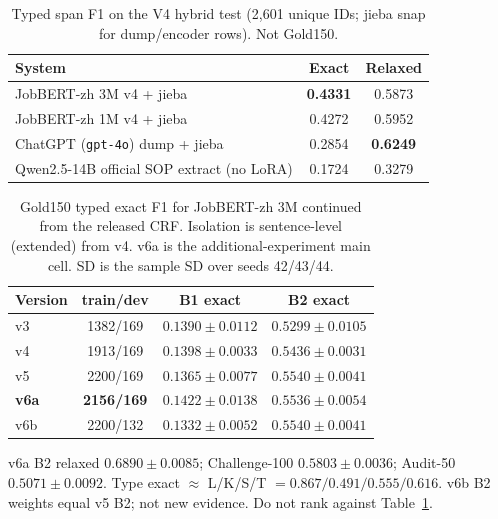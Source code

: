 
\begin{table}[t]
\caption{Typed span F1 on the V4 hybrid test (2,601 unique IDs; jieba snap for dump/encoder rows). Not Gold150.}
\label{tab:hybrid2601}
\centering
\begin{tabular}{lcc}
\hline
System & Exact & Relaxed \\
\hline
JobBERT-zh 3M v4 + jieba & \textbf{0.4331} & 0.5873 \\
JobBERT-zh 1M v4 + jieba & 0.4272 & 0.5952 \\
ChatGPT (\texttt{gpt-4o}) dump + jieba & 0.2854 & \textbf{0.6249} \\
Qwen2.5-14B official SOP extract (no LoRA) & 0.1724 & 0.3279 \\
\hline
\end{tabular}
\end{table}

\begin{table}[t]
\caption{Gold150 typed exact F1 for JobBERT-zh 3M continued from the released CRF. Isolation is sentence-level (extended) from v4. v6a is the additional-experiment main cell. SD is the sample SD over seeds 42/43/44.}
\label{tab:gold150-jobbert}
\centering
\begin{tabular}{lccc}
\hline
Version & train/dev & B1 exact & B2 exact \\
\hline
v3 & 1382/169 & $0.1390\pm0.0112$ & $0.5299\pm0.0105$ \\
v4 & 1913/169 & $0.1398\pm0.0033$ & $0.5436\pm0.0031$ \\
v5 & 2200/169 & $0.1365\pm0.0077$ & $0.5540\pm0.0041$ \\
\textbf{v6a} & \textbf{2156/169} & $0.1422\pm0.0138$ & $\mathbf{0.5536\pm0.0054}$ \\
v6b & 2200/132 & $0.1332\pm0.0052$ & $0.5540\pm0.0041$ \\
\hline
\end{tabular}

\vspace{0.4em}
{\small v6a B2 relaxed $0.6890\pm0.0085$; Challenge-100 $0.5803\pm0.0036$; Audit-50 $0.5071\pm0.0092$.
Type exact $\approx$ L/K/S/T $=0.867/0.491/0.555/0.616$.
v6b B2 weights equal v5 B2; not new evidence.
Do not rank against Table~\ref{tab:hybrid2601}.}
\end{table}

